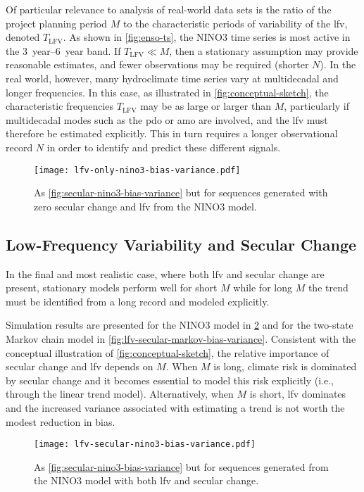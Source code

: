 \documentclass[
  draft,
  linenumbers
]{agujournal2018}
\makeatletter
\newcommand{\ie}{i.e.\@\xspace}
\makeatother
\begin{document}
Of particular relevance to analysis of real-world data sets is the ratio of the project planning period $M$ to the characteristic periods of variability of the \gls{lfv}, denoted $T_{\text{LFV}}$.
As shown in \cref{fig:enso-ts}, the NINO3 time series is most active in the \SIrange{3}{6}{year} band.
If $T_{\text{LFV}} \ll M$, then a stationary assumption may provide reasonable estimates, and fewer observations may be required (shorter $N$).
In the real world, however, many hydroclimate time series vary at multidecadal and longer frequencies.
In this case, as illustrated in \cref{fig:conceptual-sketch}, the characteristic frequencies $T_{\text{LFV}}$ may be as large or larger than $M$, particularly if multidecadal modes such as the \gls{pdo} or \gls{amo} are involved, and the \gls{lfv} must therefore be estimated explicitly.
This in turn requires a longer observational record $N$ in order to identify and predict these different signals.

\begin{figure}
  \centering
  \texttt{[image: lfv-only-nino3-bias-variance.pdf]}
  \caption{
    As \cref{fig:secular-nino3-bias-variance} but for sequences generated with zero secular change and \gls{lfv} from the NINO3 model.
  }\label{fig:lfv-nino3-bias-variance}
\end{figure}

\subsection{Low-Frequency Variability and Secular Change}

In the final and most realistic case, where both \gls{lfv} and secular change are present, stationary models perform well for short $M$ while for long $M$ the trend must be identified from a long record and modeled explicitly.

Simulation results are presented for the NINO3 model in \cref{fig:lfv-secular-nino3-bias-variance} and for the two-state Markov chain model in \cref{fig:lfv-secular-markov-bias-variance}.
Consistent with the conceptual illustration of \cref{fig:conceptual-sketch}, the relative importance of secular change and \gls{lfv} depends on $M$.
When $M$ is long, climate risk is dominated by secular change and it becomes essential to model this risk explicitly (\ie, through the linear trend model).
Alternatively, when $M$ is short, \gls{lfv} dominates and the increased variance associated with estimating a trend is not worth the modest reduction in bias.
\begin{figure}
  \centering
  \texttt{[image: lfv-secular-nino3-bias-variance.pdf]}
  \caption{
    As \cref{fig:secular-nino3-bias-variance} but for sequences generated from the NINO3 model with both \gls{lfv} and secular change.
  }\label{fig:lfv-secular-nino3-bias-variance}
\end{figure}
\end{document}
